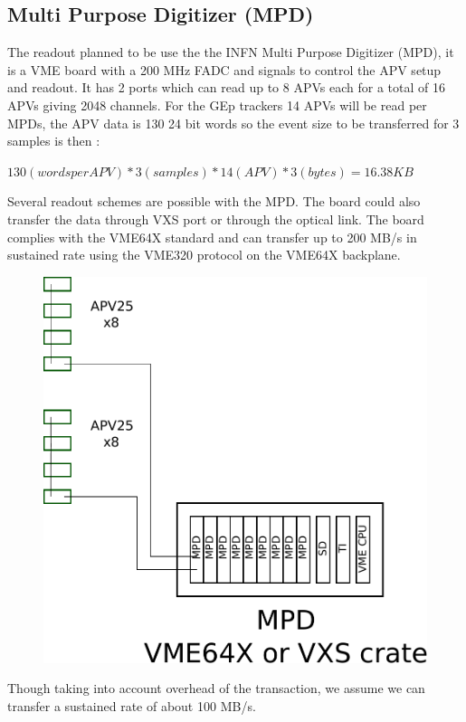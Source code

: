 \documentclass{article}
\begin{document}
\subsection {Multi Purpose Digitizer (MPD)}
 The readout planned to be use the the INFN Multi Purpose Digitizer (MPD), it is a VME board with a 200 MHz FADC and signals to control the APV setup and readout. It has 2 ports which can read up to 8 APVs each for a total of 16 APVs giving 2048 channels. 
For the GEp trackers 14 APVs will be read per MPDs, the APV data is 130 24 bit words so the event size to be transferred for 3 samples is then :

$130 ( words per APV ) * 3 (samples ) * 14 (APV ) * 3 (bytes ) = 16.38 KB $

Several readout schemes are possible with the MPD.  The board could also transfer the data through VXS port or through the optical link. The board complies with the VME64X standard and can transfer up to 200 MB/s in sustained rate using the VME320 protocol on the VME64X backplane. 

\begin{figure}
\includegraphics[scale=0.55]{figs/OldMPD.pdf}\\
\end{figure}
Though taking into account overhead of the transaction, we assume we can transfer a sustained rate of about 100 MB/s.
\end{document}
